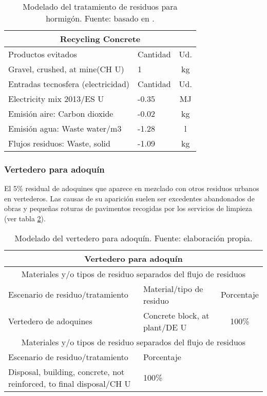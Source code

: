 \begin{table}[!htb]
\centering
\begin{tabular}{p{8cm}p{2cm}c}
\toprule
\multicolumn{3}{c}{Recycling Concrete}\\
\midrule
Productos evitados & Cantidad & Ud.\\
\midrule
Gravel, crushed, at mine(CH U) & 1 & kg\\
\midrule
Entradas tecnosfera (electricidad) & Cantidad & Ud.\\
\midrule
Electricity mix 2013/ES U & -0.35 & \si{MJ}\\
Emisión aire: Carbon dioxide & -0.02 & \si{kg}\\
Emisión agua: Waste water/m3 & -1.28 & \si{l}\\
Flujos residuos: Waste, solid & -1.09 & \si{kg}\\
\bottomrule
\end{tabular}
\caption[Modelado del tratamiento de residuos para hormigón.]{Modelado del tratamiento de residuos para hormigón. Fuente: basado en \cite{nsw}.}
\label{modeladoresiduoshormigon}
\end{table}

\subsubsection{Vertedero para adoquín}
El 5\% residual de adoquines que aparece en mezclado con otros residuos urbanos en vertederos. Las causas de su aparición suelen ser excedentes abandonados de obras y pequeñas roturas de pavimentos recogidas por los servicios de limpieza (ver tabla \ref{modeladovertederoadoquin}).

\begin{table}[!htb]
\centering
\begin{tabular}{p{8cm}p{2cm}c}
\toprule
\multicolumn{3}{c}{Vertedero para adoquín}\\
\midrule
\multicolumn{3}{c}{Materiales y/o tipos de residuo separados del flujo de residuos}\\
\midrule
Escenario de residuo/tratamiento & Material/tipo de residuo & Porcentaje\\
\midrule
Vertedero de adoquines & Concrete block, at plant/DE U & 100\%\\
\midrule
\multicolumn{3}{c}{Materiales y/o tipos de residuo separados del flujo de residuos}\\
\midrule
Escenario de residuo/tratamiento & Porcentaje & \\
\midrule
Disposal, building, concrete, not reinforced, to final disposal/CH U & 100\% & \\
\bottomrule
\end{tabular}
\caption[Modelado del vertedero para adoquín.]{Modelado del vertedero para adoquín. Fuente: elaboración propia.}
\label{modeladovertederoadoquin}
\end{table}

